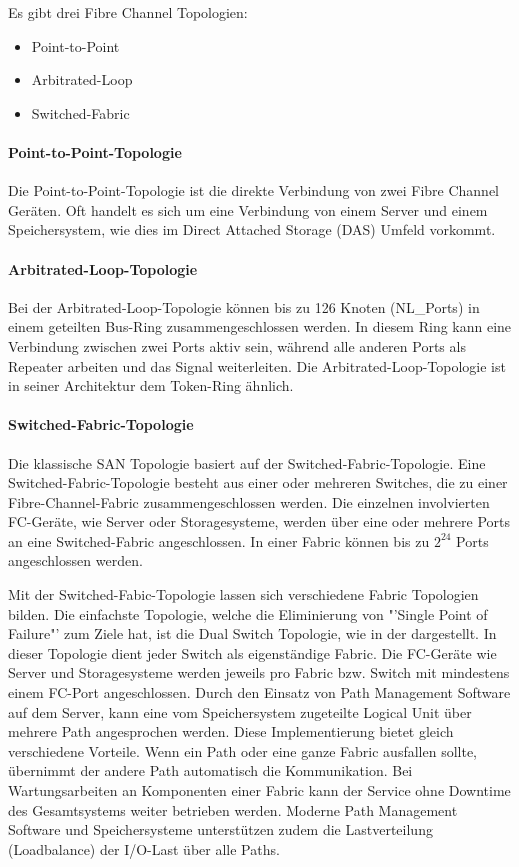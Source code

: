 Es gibt drei Fibre Channel Topologien:
\begin{itemize}
\item Point-to-Point
\item Arbitrated-Loop
\item Switched-Fabric
\end{itemize}

\paragraph*{Point-to-Point-Topologie}
Die Point-to-Point-Topologie ist die direkte Verbindung von zwei Fibre Channel Geräten. Oft handelt es sich um eine Verbindung von einem Server und einem Speichersystem, wie dies im Direct Attached Storage (DAS) Umfeld vorkommt. \cite{Christopher2009}

\paragraph*{Arbitrated-Loop-Topologie}
Bei der Arbitrated-Loop-Topologie können bis zu 126 Knoten (NL\_Ports) in einem geteilten Bus-Ring zusammengeschlossen werden. In diesem Ring kann eine Verbindung zwischen zwei Ports aktiv sein, während alle anderen Ports als Repeater arbeiten und das Signal weiterleiten. Die Arbitrated-Loop-Topologie ist in seiner Architektur dem Token-Ring ähnlich.\cite{Gupta2002}\cite{Christopher2009}

\paragraph*{Switched-Fabric-Topologie}
Die klassische SAN Topologie basiert auf der Switched-Fabric-Topologie. Eine Switched-Fabric-Topologie besteht aus einer oder mehreren Switches, die zu einer Fibre-Channel-Fabric zusammengeschlossen werden. Die einzelnen involvierten FC-Geräte, wie Server oder Storagesysteme, werden über eine oder mehrere Ports an eine Switched-Fabric angeschlossen. In einer Fabric können bis zu $2^{24}$ Ports angeschlossen werden.\cite{Gupta2002}\cite{Christopher2009}

Mit der Switched-Fabic-Topologie lassen sich verschiedene Fabric Topologien bilden.
Die einfachste Topologie, welche die Eliminierung von "'Single Point of Failure"' zum Ziele hat, ist die Dual Switch Topologie, wie in der  dargestellt. In dieser Topologie dient jeder Switch als eigenständige Fabric. Die FC-Geräte wie Server und Storagesysteme werden jeweils pro Fabric bzw. Switch mit mindestens einem FC-Port angeschlossen. Durch den Einsatz von Path Management Software auf dem Server, kann eine vom Speichersystem zugeteilte Logical Unit über mehrere Path angesprochen werden. Diese Implementierung bietet gleich verschiedene Vorteile. Wenn ein Path oder eine ganze Fabric ausfallen sollte, übernimmt der andere Path automatisch die Kommunikation. Bei Wartungsarbeiten an Komponenten einer Fabric kann der Service ohne Downtime des Gesamtsystems weiter betrieben werden. Moderne Path Management Software und Speichersysteme unterstützen zudem die Lastverteilung (Loadbalance) der I/O-Last über alle Paths.\cite{Christopher2009}

